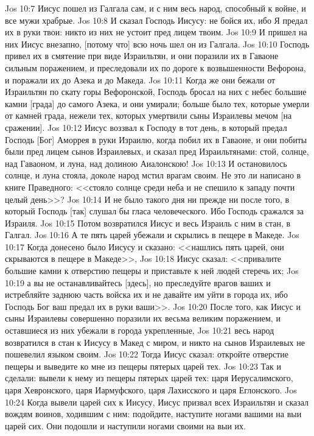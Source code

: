 \vs Jos 10:7 Иисус пошел из Галгала сам, и с ним весь народ, способный к войне, и все мужи храбрые.
\rsbpar\vs Jos 10:8 И сказал Господь Иисусу: не бойся их, ибо Я предал их в руки твои: никто из них не устоит пред лицем твоим.
\vs Jos 10:9 И пришел на них Иисус внезапно, [потому что] всю ночь шел он из Галгала.
\vs Jos 10:10 Господь привел их в смятение при виде Израильтян, и они поразили их в Гаваоне сильным поражением, и преследовали их по дороге к возвышенности Вефорона, и поражали их до Азека и до Македа.
\vs Jos 10:11 Когда же они бежали от Израильтян по скату горы Вефоронской, Господь бросал на них с небес большие камни [града] до самого Азека, и они умирали; больше было тех, которые умерли от камней града, нежели тех, которых умертвили сыны Израилевы мечом [на сражении].
\vs Jos 10:12 Иисус воззвал к Господу в тот день, в который предал Господь [Бог] Аморрея в руки Израилю, когда побил их в Гаваоне, и они побиты были пред лицем сынов Израилевых, и сказал пред Израильтянами: стой, солнце, над Гаваоном, и луна, над долиною Аиалонскою!
\vs Jos 10:13 И остановилось солнце, и луна стояла, доколе народ мстил врагам своим. Не это ли написано в книге Праведного: <<стояло солнце среди неба и не спешило к западу почти целый день>>?
\vs Jos 10:14 И не было такого дня ни прежде ни после того, в который Господь [так] слушал бы гласа человеческого. Ибо Господь сражался за Израиля.
\vs Jos 10:15 Потом возвратился Иисус и весь Израиль с ним в стан, в Галгал.
\vs Jos 10:16 А те пять царей убежали и скрылись в пещере в Македе.
\vs Jos 10:17 Когда донесено было Иисусу и сказано: <<нашлись пять царей, они скрываются в пещере в Македе>>,
\vs Jos 10:18 Иисус сказал: <<привалите большие камни к отверстию пещеры и приставьте к ней людей стеречь их;
\vs Jos 10:19 а вы не останавливайтесь [здесь], но преследуйте врагов ваших и истребляйте заднюю часть войска их и не давайте им уйти в города их, ибо Господь Бог ваш предал их в руки ваши>>.
\rsbpar\vs Jos 10:20 После того, как Иисус и сыны Израилевы совершенно поразили их весьма великим поражением, и оставшиеся из них убежали в города укрепленные,
\vs Jos 10:21 весь народ возвратился в стан к Иисусу в Макед с миром, и никто на сынов Израилевых не пошевелил языком своим.
\vs Jos 10:22 Тогда Иисус сказал: откройте отверстие пещеры и выведите ко мне из пещеры пятерых царей тех.
\vs Jos 10:23 Так и сделали: вывели к нему из пещеры пятерых царей тех: царя Иерусалимского, царя Хевронского, царя Иармуфского, царя Лахисского и царя Еглонского.
\vs Jos 10:24 Когда вывели царей сих к Иисусу, Иисус призвал всех Израильтян и сказал вождям воинов, ходившим с ним: подойдите, наступите ногами вашими на выи царей сих. Они подошли и наступили ногами своими на выи их.
